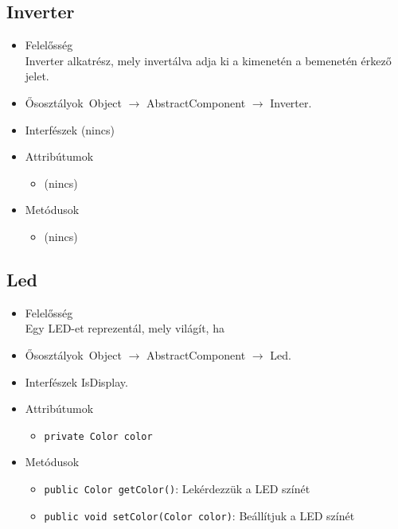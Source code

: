 \subsection{Inverter}
\begin{itemize}
\item Felelősség\\
Inverter alkatrész, mely invertálva adja ki a kimenetén a bemenetén  érkező jelet.
\item Ősosztályok\ Object $\rightarrow{}$ AbstractComponent $\rightarrow{}$ Inverter.
\item Interfészek (nincs)
\item Attribútumok $\ $
\begin{itemize}
\item (nincs)
\end{itemize}
\item Metódusok$\ $
\begin{itemize}
\item (nincs)
\end{itemize}
\end{itemize}

\subsection{Led}
\begin{itemize}
\item Felelősség\\
Egy LED-et reprezentál, mely világít, ha
\item Ősosztályok\ Object $\rightarrow{}$ AbstractComponent $\rightarrow{}$ Led.
\item Interfészek IsDisplay.
\item Attribútumok $\ $
\begin{itemize}
	\item \texttt{private Color color} 
\end{itemize}
\item Metódusok$\ $
\begin{itemize}
	\item \texttt{public Color getColor()}: Lekérdezzük a LED színét
	\item \texttt{public void setColor(Color color)}: Beállítjuk a LED színét
\end{itemize}
\end{itemize}

